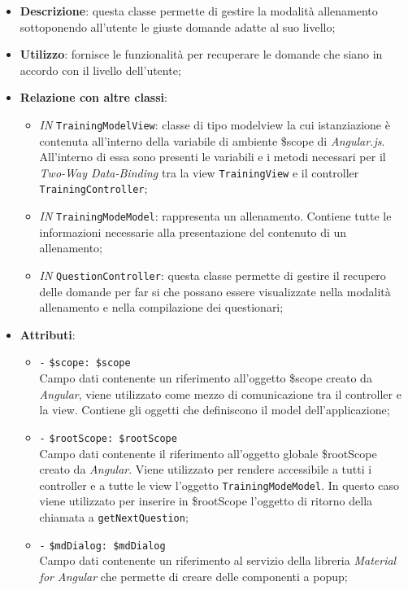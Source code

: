\begin{itemize}
	\item \textbf{Descrizione}: questa classe permette di gestire la modalità allenamento sottoponendo all'utente le giuste domande adatte al suo livello;
	\item \textbf{Utilizzo}: fornisce le funzionalità per recuperare le domande che siano in accordo con il livello dell'utente;
	\item \textbf{Relazione con altre classi}:
	\begin{itemize}
		\item \textit{IN} \texttt{TrainingModelView}: classe di tipo modelview la cui istanziazione è contenuta all'interno della variabile di ambiente \$scope di \textit{Angular.js}. All'interno di essa sono presenti le variabili e i metodi necessari per il \textit{Two-Way Data-Binding} tra la view \texttt{TrainingView} e il controller \texttt{TrainingController};
		\item \textit{IN} \texttt{TrainingModeModel}: rappresenta un allenamento. Contiene tutte le informazioni necessarie alla	presentazione del contenuto di un allenamento;
		\item \textit{IN} \texttt{QuestionController}: questa classe permette di gestire il recupero delle domande per far si che possano essere visualizzate nella modalità allenamento e nella compilazione dei questionari;
	\end{itemize}
	\item \textbf{Attributi}:
	\begin{itemize}
		\item \texttt{-} \texttt{\$scope: \$scope} \\
		Campo dati contenente un riferimento all’oggetto \$scope creato da \textit{Angular}, viene utilizzato come mezzo di comunicazione tra il controller e la view. Contiene gli oggetti che definiscono il model dell’applicazione;
		\item \texttt{-} \texttt{\$rootScope: \$rootScope} \\
		Campo dati contenente il riferimento all'oggetto globale \$rootScope creato da \textit{Angular}. Viene utilizzato per rendere accessibile a tutti i controller e a tutte le view l'oggetto \texttt{TrainingModeModel}. In questo caso viene utilizzato per inserire in \$rootScope l'oggetto di ritorno della chiamata a \texttt{getNextQuestion};
		\item \texttt{-} \texttt{\$mdDialog: \$mdDialog} \\
		Campo dati contenente un riferimento al servizio della libreria \textit{Material for Angular} che permette di creare delle componenti a popup;

\end{itemize}
\end{itemize}
